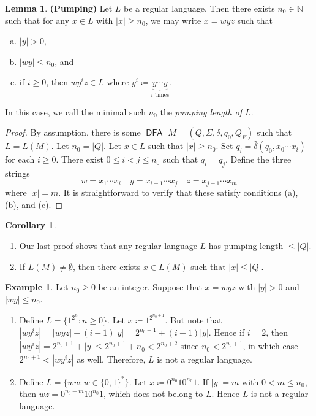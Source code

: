 \documentclass[10pt,letterpaper,cm]{nupset}
\theoremstyle{definition}
\newtheorem{exmp}{Example}
\newtheorem{corollary}{Corollary}
\newtheorem{lemma}{Lemma}
\newcommand{\N}{\mathbb N}
\newcommand{\1}{\mathbf{1}}
\newcommand{\0}{\vec 0}
\DeclareMathOperator{\DFA}{\mathsf{DFA}}
\begin{document}
\begin{lemma}{\textbf{(Pumping)}} Let $L$ be a regular language. Then there exists $n_0 \in \N$ such that for any $x\in L$ with $|x|\geq n_0$, we may write $x=wyz$ such that
\begin{enumerate}[(a)]
\item $|y| >0$,
\item $|wy|\leq n_0$, and
\item if $i\geq 0$, then $wy^iz \in L$ where $y^i \coloneqq \underbrace{y\cdots y}_{i \text{ times}}$.
\end{enumerate}
In this case, we call the minimal such $n_0$ the \textit{pumping length of $L$}.
\end{lemma}
\begin{proof}
By assumption, there is some $\DFA$ $M = (Q, \Sigma, \delta, q_0, Q_F)$ such that $L = L(M)$. Let $n_0 = |Q|$. Let $x\in L$ such that $|x|\geq n_0$. Set $q_i = \hat{\delta}(q_0, x_0 \cdots x_i)$ for each $i\geq 0$.  There exist $0\leq i<j \leq n_0$ such that $q_i = q_j$. Define the three strings $$w= x_1\cdots x_i \quad  y= x_{i+1}\cdots x_j \quad z= x_{j+1} \cdots x_m$$ where $|x| = m$. It is straightforward to verify that these satisfy conditions (a), (b), and (c).
\end{proof}
\begin{corollary} $ $
\begin{enumerate} 
\item Our last proof shows that any regular language $L$ has pumping length $\leq |Q|$.
\item If $L(M) \ne \emptyset$, then there exists $x\in L(M)$ such that $|x| \leq |Q|$.
\end{enumerate}
\end{corollary}

\begin{exmp} Let $n_0\geq 0$ be an integer. Suppose that $x=wyz$ with $|y| >0$ and $|wy|\leq n_0$.
\begin{enumerate}
\item Define $L=  \{ 1^{2^n} : n\geq 0\}$. Let $x\coloneqq 1^{2^{n_0+1}}$.  But note that $|wy^iz| = |wyz| + (i-1)|y| = 2^{n_0+1} + (i-1)|y|$. Hence if $i=2$, then $|wy^i z| = 2^{n_0+1} +|y| \leq 2^{n_0+1} +n_0 < 2^{n_0+2}$ since $n_0 < 2^{n_0+1}$, in which case $2^{n_0+1} < |wy^iz|$ as well. Therefore, $L$ is not a regular language. 
\item Define $L = \{ ww : w \in \{0,1\}^{\ast}\}$. Let $x\coloneqq 0^{n_0}10^{n_0}1$. If $|y|= m$ with $0<m\leq n_0$,  then $wz= 0^{n_0-m}10^{n_0}1$, which does not belong to $L$. Hence $L$ is not a regular language. 
\end{enumerate}
\end{exmp}
\end{document}
